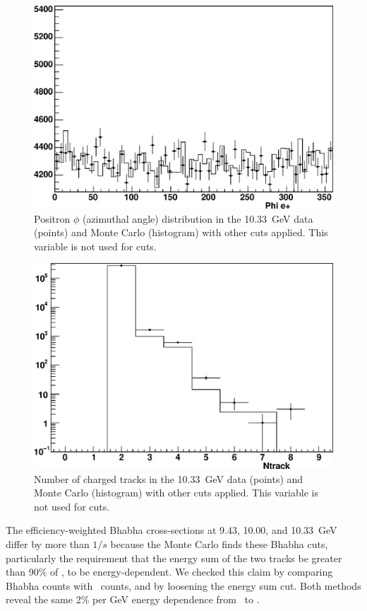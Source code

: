 \documentclass{cornell}
\begin{document}
\begin{figure}[p]
  \begin{center}
    \includegraphics[width=0.7\linewidth]{eeagreemente}
  \end{center}
  \caption[Positron $\phi$ distribution in Bhabha events]{\label{eeagreementg} Positron $\phi$ (azimuthal angle)
  distribution in the 10.33~GeV data (points) and Monte Carlo
  (histogram) with other cuts applied.  This variable is not used for
  cuts.}
\end{figure}

\begin{figure}[p]
  \begin{center}
    \includegraphics[width=0.7\linewidth]{eeagreementh}
  \end{center}
  \caption[Number of charged tracks in Bhabha events]{\label{eeagreementh} Number of charged tracks in the
  10.33~GeV data (points) and Monte Carlo (histogram) with other cuts
  applied.  This variable is not used for cuts.}
\end{figure}

The efficiency-weighted Bhabha cross-sections at 9.43, 10.00, and
10.33~GeV differ by more than $1/s$ because the Monte Carlo finds
these Bhabha cuts, particularly the requirement that the energy sum of
the two tracks be greater than 90\% of \ecm, to be energy-dependent.
We checked this claim by comparing Bhabha counts with \gamgam\ counts,
and by loosening the energy sum cut.  Both methods reveal the same 2\%
per GeV energy dependence from \us\ to \usss.
\end{document}
